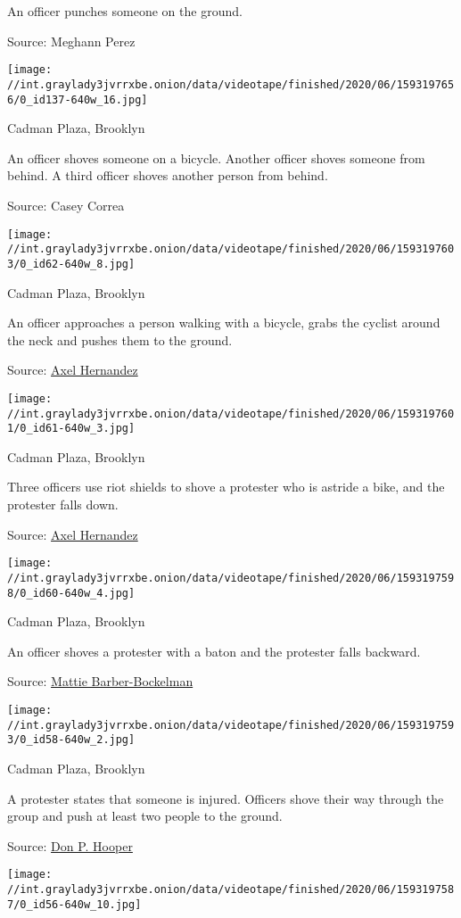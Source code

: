  An officer punches someone on the ground.

Source: Meghann Perez

\texttt{[image: //int.graylady3jvrrxbe.onion/data/videotape/finished/2020/06/1593197656/0\_id137-640w\_16.jpg]}

 Cadman Plaza, Brooklyn

 An officer shoves someone on a bicycle. Another officer shoves someone
from behind. A third officer shoves another person from behind.

Source: Casey Correa

\texttt{[image: //int.graylady3jvrrxbe.onion/data/videotape/finished/2020/06/1593197603/0\_id62-640w\_8.jpg]}

 Cadman Plaza, Brooklyn

 An officer approaches a person walking with a bicycle, grabs the
cyclist around the neck and pushes them to the ground.

Source:
\href{https://twitter.com/Axelohh/status/1268649155595055104}{Axel
Hernandez}

\texttt{[image: //int.graylady3jvrrxbe.onion/data/videotape/finished/2020/06/1593197601/0\_id61-640w\_3.jpg]}

 Cadman Plaza, Brooklyn

 Three officers use riot shields to shove a protester who is astride a
bike, and the protester falls down.

Source:
\href{https://twitter.com/Axelohh/status/1268648944269242369}{Axel
Hernandez}

\texttt{[image: //int.graylady3jvrrxbe.onion/data/videotape/finished/2020/06/1593197598/0\_id60-640w\_4.jpg]}

 Cadman Plaza, Brooklyn

 An officer shoves a protester with a baton and the protester falls
backward.

Source:
\href{https://twitter.com/mattieump/status/1269094834926649349}{Mattie
Barber-Bockelman}

\texttt{[image: //int.graylady3jvrrxbe.onion/data/videotape/finished/2020/06/1593197593/0\_id58-640w\_2.jpg]}

 Cadman Plaza, Brooklyn

 A protester states that someone is injured. Officers shove their way
through the group and push at least two people to the ground.

Source:
\href{https://www.instagram.com/tv/CA_odIIjXCM/?igshid=1x9dd6psx40tj}{Don
P. Hooper}

\texttt{[image: //int.graylady3jvrrxbe.onion/data/videotape/finished/2020/06/1593197587/0\_id56-640w\_10.jpg]}

